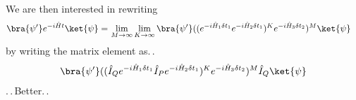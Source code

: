 \documentclass{report}
\begin{document}
We are then interested in rewriting
\begin{align}
\begin{aligned}
	\bra{\psi'} e^{-i \hat H t} \ket{\psi}
	=&\,
	\lim_{M \to \infty} \lim_{K \to \infty} 
		\bra{\psi'} (
			(e^{-i  \hat H_{1} \delta t_1 } e^{-i \hat H_{2} \delta t_1})^{K}
			e^{-i  \hat H_{3} \delta t_2}
		)^M
		\ket{\psi}
\end{aligned}
\end{align} 
by writing the matrix element as.\,.
\begin{align}
\begin{aligned}
	\bra{\psi'} 
		(
			(
				\hat I_Q 
				e^{-i  \hat H_{1} \delta t_1 } 
				\hat I_P 
				e^{-i \hat H_{2} \delta t_1} 
			)^{K}
			e^{-i  \hat H_{3} \delta t_2}
		)^M 
		\hat I_Q
	\ket{\psi}
\end{aligned}
\end{align}
.\,.\,Better.\,. %
\end{document}
